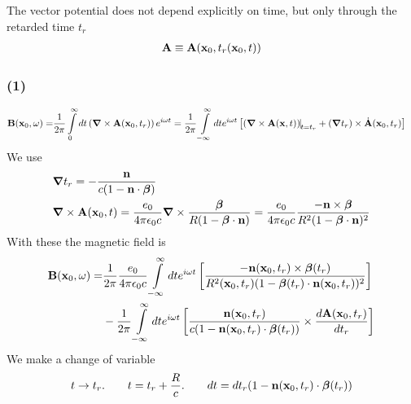 The vector potential does not depend explicitly on time, but only through the retarded time $t_r$
\begin{align}
    {\bf A}\equiv {\bf A}({\bf x}_0,t_r({\bf x}_0,t))
\end{align}

\subsubsection{(1)}

\begin{align}
    {\bf B}({\bf x}_0,\omega)= & \frac1{2\pi}\int\limits_0^{\infty}dt \left({\boldsymbol{\nabla}}\times{\bf A}({\bf x}_0,t_r)\right)e^{i\omega t}= \frac1{2\pi}\int\limits_{-\infty}^{\infty}dt e^{i\omega t}\left[{\left({\boldsymbol{\nabla}}\times{\bf A}({\bf x},t)\right)\vline}_{t=t_r}+({\boldsymbol\nabla} t_r)\times\dot{\bf A}({\bf x}_0,t_r)\right]
\end{align}
We use
\begin{align}
     & {\boldsymbol{\nabla}} t_r=                                                                                     -\frac{{\bf n}}{c                                                                                        (1-{\bf n}\cdot{\boldsymbol{\beta}})}                             \\
     & {\boldsymbol{\nabla}}\times{\bf A}({\bf x}_0,t)=\frac{e_0}{4\pi\epsilon_0 c}{\boldsymbol{\nabla}}\times\frac{{\boldsymbol{\beta}}}{R(1-{\boldsymbol{\beta}}\cdot{\bf n})}=\frac{e_0}{4\pi\epsilon_0c}\frac{-{\bf n}\times{\boldsymbol{\beta}}}{R^2(1-{\boldsymbol{\beta}}\cdot{\bf n})^2}
\end{align}
With these the magnetic field is
\begin{align}
    {\bf B}({\bf x}_0,\omega)= & \frac1{2\pi}\frac{e_0}{4\pi\epsilon_0c}\int\limits_{-\infty}^{\infty}dt e^{i\omega t}\left[\frac{-{\bf n}({\bf x}_0,t_r)\times{\boldsymbol{\beta}}(t_r)}{R^2({\bf x}_0,t_r)(1-{\boldsymbol{\beta}}(t_r)\cdot{\bf n}({\bf x}_0,t_r))^2}\right]                                                    \nonumber \\
                               & -\frac1{2\pi} \int\limits_{-\infty}^{\infty}dt e^{i\omega t}\left[\frac{{\bf n}({\bf x}_0,t_r)}{c                                                                                        (1-{\bf n}({\bf x}_0,t_r)\cdot{\boldsymbol{\beta}}(t_r))}\times\frac{d{\bf A}({\bf x}_0,t_r)}{dt_r}\right]
\end{align}
We make a change of variable
\begin{align}
    t\rightarrow t_r.\qquad  t=t_r+\frac{R}{c}.\qquad dt=dt_r(1-{\bf n}({\bf x}_0,t_r)\cdot{\boldsymbol{\beta}}(t_r))
\end{align}
